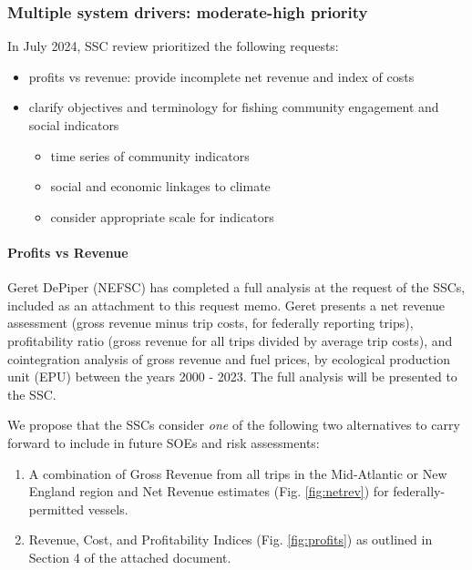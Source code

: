 \documentclass[
  10pt,
]{article}
\providecommand{\tightlist}{%
  \setlength{\itemsep}{0pt}\setlength{\parskip}{0pt}}
\begin{document}
\subsubsection{Multiple system drivers: moderate-high
priority}\label{multiple-system-drivers-moderate-high-priority}

In July 2024, SSC review prioritized the following requests:

\begin{itemize}
\tightlist
\item
  profits vs revenue: provide incomplete net revenue and index of costs
\item
  clarify objectives and terminology for fishing community engagement
  and social indicators

  \begin{itemize}
  \tightlist
  \item
    time series of community indicators
  \item
    social and economic linkages to climate
  \item
    consider appropriate scale for indicators
  \end{itemize}
\end{itemize}

\paragraph{Profits vs Revenue}\label{profits-vs-revenue}

Geret DePiper (NEFSC) has completed a full analysis at the request of
the SSCs, included as an attachment to this request memo. Geret presents
a net revenue assessment (gross revenue minus trip costs, for federally
reporting trips), profitability ratio (gross revenue for all trips
divided by average trip costs), and cointegration analysis of gross
revenue and fuel prices, by ecological production unit (EPU) between the
years 2000 - 2023. The full analysis will be presented to the SSC.

We propose that the SSCs consider \emph{one} of the following two
alternatives to carry forward to include in future SOEs and risk
assessments:

\begin{enumerate}
\def\labelenumi{\arabic{enumi}.}
\tightlist
\item
  A combination of Gross Revenue from all trips in the Mid-Atlantic or
  New England region and Net Revenue estimates (Fig. \ref{fig:netrev})
  for federally-permitted vessels.\\
\item
  Revenue, Cost, and Profitability Indices (Fig. \ref{fig:profits}) as
  outlined in Section 4 of the attached document.
\end{enumerate}
\end{document}
